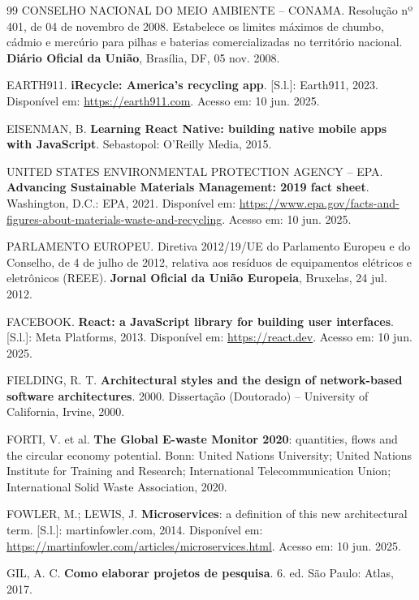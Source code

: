 \documentclass[12pt, a4paper]{article}
\numberwithin{equation}{section}
\numberwithin{figure}{section}
\numberwithin{table}{section}
\begin{document}
\begin{thebibliography}{99}
CONSELHO NACIONAL DO MEIO AMBIENTE -- CONAMA. Resolução nº 401, de 04 de
novembro de 2008. Estabelece os limites máximos de chumbo, cádmio e mercúrio
para pilhas e baterias comercializadas no território nacional.
\textbf{Diário Oficial da União}, Brasília, DF, 05 nov. 2008.

EARTH911. \textbf{iRecycle: America's recycling app}. [S.l.]: Earth911, 2023.
Disponível em: \url{https://earth911.com}. Acesso em: 10 jun. 2025.

EISENMAN, B.
\textbf{Learning React Native: building native mobile apps with JavaScript}.
Sebastopol: O'Reilly Media, 2015.

UNITED STATES ENVIRONMENTAL PROTECTION AGENCY -- EPA.
\textbf{Advancing Sustainable Materials Management: 2019 fact sheet}.
Washington, D.C.: EPA, 2021. Disponível em:
\url{https://www.epa.gov/facts-and-figures-about-materials-waste-and-recycling}.
Acesso em: 10 jun. 2025.

PARLAMENTO EUROPEU. Diretiva 2012/19/UE do Parlamento Europeu e do Conselho,
de 4 de julho de 2012, relativa aos resíduos de equipamentos elétricos e
eletrônicos (REEE).
\textbf{Jornal Oficial da União Europeia}, Bruxelas, 24 jul. 2012.

FACEBOOK. \textbf{React: a JavaScript library for building user interfaces}.
[S.l.]: Meta Platforms, 2013. Disponível em: \url{https://react.dev}.
Acesso em: 10 jun. 2025.

FIELDING, R. T.
\textbf{Architectural styles and the design of network-based software
architectures}. 2000. Dissertação (Doutorado) -- University of California,
Irvine, 2000.

FORTI, V. et al.
\textbf{The Global E-waste Monitor 2020}: quantities, flows and the circular
economy potential. Bonn: United Nations University; United Nations Institute
for Training and Research; International Telecommunication Union; International
Solid Waste Association, 2020.

FOWLER, M.; LEWIS, J. \textbf{Microservices}: a definition of this new
architectural term. [S.l.]: martinfowler.com, 2014. Disponível em:
\url{https://martinfowler.com/articles/microservices.html}.
Acesso em: 10 jun. 2025.

GIL, A. C.
\textbf{Como elaborar projetos de pesquisa}. 6. ed. São Paulo: Atlas, 2017.


\end{thebibliography}
\end{document}
